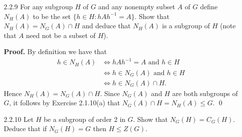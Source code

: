 \begin{enumerate}
      \textbf{Proof.} Let $I_n = \{1, 2, \ldots, n\}$. Now consider the map 
      $f: G \times I_n \rightarrow I_n$, $(g, a) \mapsto g(a)$. We want to first
      show that $f$ is a group action of $G$ on $I_n$. Let $\sigma_1$,
      $\sigma_2 \in G$ and $a \in I_n$. So it follows that $f(1, a) = 1(a) = a$
      and
      \begin{align*}
         f(\sigma_1, f(\sigma_2, a)) &= f(\sigma_1, \sigma_2(a)) \\
            &= \sigma_1(\sigma_2(a)) \\
            &= (\sigma_1 \circ \sigma_2)(a) \\
            &= f(\sigma_1 \circ \sigma_2, a),
      \end{align*}
      so that $f$ is a group action. Now $G_i$ is the stabilizer of $i$ in $G$;
      thus $|G_i| \le G$ by Exercise 1.7.4(b). By counting we have that
      $|G_i| = (n - 1)!$ \qed
   \item[2.2.9]   For any subgroup $H$ of $G$ and any nonempty subset $A$ of $G$
                  define $N_H(A)$ to be the set $\{h \in H : hAh^{-1} = A\}$.
                  Show that $N_H(A) = N_G(A) \cap H$ and deduce that $N_H(A)$ is
                  a subgroup of $H$ (note that $A$ need not be a subset of $H$).

      \textbf{Proof.} By definition we have that
      \begin{align*}
          h \in N_H(A) &\Longleftrightarrow hAh^{-1} = A \text{ and } h \in H \\
            &\Longleftrightarrow h \in N_G(A) \text{ and } h \in H\\
            &\Longleftrightarrow h \in N_G(A) \cap H.
      \end{align*}
      Hence $N_H(A) = N_G(A) \cap H$. Since $N_G(A)$ and $H$ are both subgroups
      of $G$, it follows by Exercise 2.1.10(a) that
      $N_G(A) \cap H = N_H(A) \le G$. \qed
   \item[2.2.10]  Let $H$ be a subgroup of order 2 in $G$. Show that
                  $N_G(H) = C_G(H)$. Deduce that if $N_G(H) = G$ then
                  $H \le Z(G)$.


\end{enumerate}
